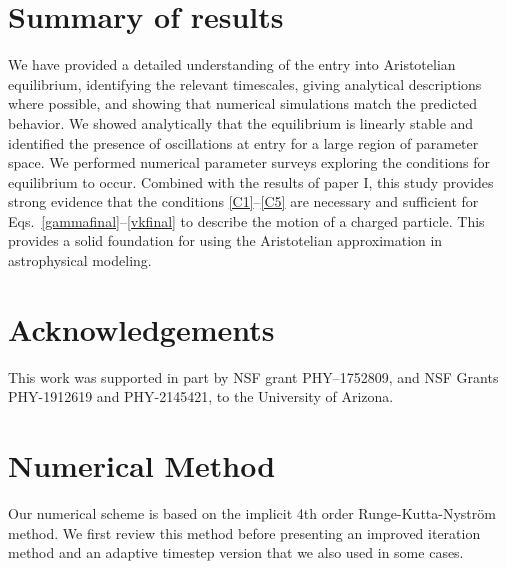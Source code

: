 \documentclass[amsmath,amssymb,nofootinbib,notitlepage,superscriptaddress,twocolumn]{revtex4-2}
\begin{document}
\section{Summary of results}\label{sec:summary}

We have provided a detailed understanding of the entry into Aristotelian equilibrium, identifying the relevant timescales, giving analytical descriptions where possible, and showing that numerical simulations match the predicted behavior.  We showed analytically that the equilibrium is linearly stable and identified the presence of oscillations at entry for a large region of parameter space.  We performed numerical parameter surveys exploring the conditions for equilibrium to occur.  Combined with the results of paper I, this study provides strong evidence that the conditions \eqref{C1}--\eqref{C5} are necessary and sufficient for Eqs.~\eqref{gammafinal}--\eqref{vkfinal} to describe the motion of a charged particle.  This provides a solid foundation for using the Aristotelian approximation in astrophysical modeling.

\section*{Acknowledgements} This work was
supported in part by NSF grant PHY–1752809, and NSF Grants
PHY-1912619 and PHY-2145421, to the University of Arizona.

\appendix

\section{Numerical Method}\label{sec:numerical-details}

Our numerical scheme is based on the implicit 4th order Runge-Kutta-Nystr\"om method.  We first review this method before presenting an improved iteration method and an adaptive timestep version that we also used in some cases.
\end{document}
